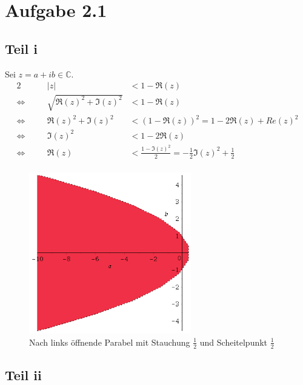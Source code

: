 \documentclass[10pt,a4paper]{article}
\begin{document}
\section{Aufgabe 2.1}

\subsection{Teil i}

Sei $z = a + ib \in \mathbb{C}$.
\begin{alignat*}{2}
&&  |z| & < 1 - \Re(z)\\
\Leftrightarrow \quad && \sqrt{\Re(z)^{2} + \Im(z)^{2}} & < 1 - \Re(z)\\
\Leftrightarrow \quad && \Re(z)^{2} + \Im(z)^{2} & < (1 - \Re(z))^{2} = 1 - 2\Re(z) + Re(z)^{2}\\
\Leftrightarrow \quad && \Im(z)^{2} & < 1 - 2\Re(z)\\
\Leftrightarrow \quad && \Re(z) & < \frac{1 - \Im(z)^{2}}{2} = -\frac{1}{2}\Im(z)^{2} + \frac{1}{2}\\
\end{alignat*}
\begin{figure}[h]
  \centering
  \includegraphics[width=200pt]{2_1_1}
  \caption{Nach links öffnende Parabel mit Stauchung $\frac{1}{2}$ und Scheitelpunkt $\frac{1}{2}$}
\end{figure}

\subsection{Teil ii}
\end{document}
